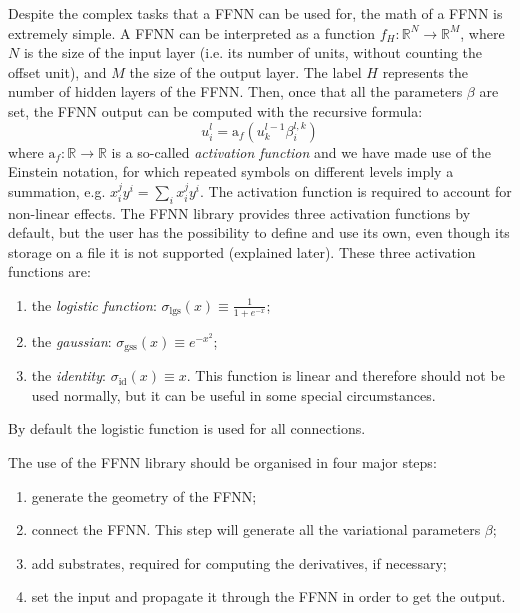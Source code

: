\documentclass[11pt,a4paper,twoside]{article}
\newcommand{\actf}{\text{a}_f}
\newcommand{\logaf}{\sigma_{\text{lgs}}}
\newcommand{\gssaf}{\sigma_{\text{gss}}}
\newcommand{\idaf}{\sigma_{\text{id}}}
\begin{document}
Despite the complex tasks that a FFNN can be used for, the math of a FFNN is extremely simple.
A FFNN can be interpreted as a function $f_H: \mathbb{R}^N \rightarrow \mathbb{R}^M$, where $N$ is the size of the input layer (i.e. its number of units, without counting the offset unit), and $M$ the size of the output layer.
The label $H$ represents the number of hidden layers of the FFNN.
Then, once that all the parameters $\beta$ are set, the FFNN output can be computed with the recursive formula:
\begin{equation}
  u^l_i = \actf( u^{l-1}_{k} \beta^{l,k}_{i}  )
\end{equation}
where $\actf: \mathbb{R} \rightarrow \mathbb{R}$ is a so-called \emph{activation function} and we have made use of the Einstein notation, for which repeated symbols on different levels imply a summation, e.g. $x_i^j y^i = \sum_i x_i^j y^i$.
The activation function is required to account for non-linear effects.
The FFNN library provides three activation functions by default, but the user has the possibility to define and use its own, even though its storage on a file it is not supported (explained later).
These three activation functions are:
\begin{enumerate}
\item the \emph{logistic function}: $\logaf(x) \equiv \frac{1}{1+e^{-x}}$;
\item the \emph{gaussian}: $\gssaf(x) \equiv e^{-x^2}$;
\item the \emph{identity}: $\idaf(x) \equiv x$. This function is linear and therefore should not be used normally, but it can be useful in some special circumstances.
\end{enumerate}
By default the logistic function is used for all connections.

The use of the FFNN library should be organised in four major steps:
\begin{enumerate}
\item generate the geometry of the FFNN;
\item connect the FFNN. This step will generate all the variational parameters $\beta$;
\item add substrates, required for computing the derivatives, if necessary;
\item set the input and propagate it through the FFNN in order to get the output.
\end{enumerate}
\end{document}
